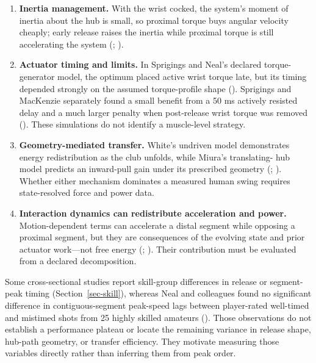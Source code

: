 \documentclass[
  letterpaper,
]{report}
\providecommand{\tightlist}{%
  \setlength{\itemsep}{0pt}\setlength{\parskip}{0pt}}
\begin{document}
\begin{enumerate}
\def\labelenumi{\arabic{enumi}.}
\tightlist
\item
  \textbf{Inertia management.} With the wrist cocked, the system's
  moment of inertia about the hub is small, so proximal torque buys
  angular velocity cheaply; early release raises the inertia while
  proximal torque is still accelerating the system
  (; ).
\item
  \textbf{Actuator timing and limits.} In Sprigings and Neal's declared
  torque-generator model, the optimum placed active wrist torque late,
  but its timing depended strongly on the assumed torque-profile shape
  (). Sprigings and
  MacKenzie separately found a small benefit from a 50 ms actively
  resisted delay and a much larger penalty when post-release wrist
  torque was removed (). These simulations do not identify a muscle-level
  strategy.
\item
  \textbf{Geometry-mediated transfer.} White's undriven model
  demonstrates energy redistribution as the club unfolds, while Miura's
  translating- hub model predicts an inward-pull gain under its
  prescribed geometry (;
  ). Whether either mechanism
  dominates a measured human swing requires state-resolved force and
  power data.
\item
  \textbf{Interaction dynamics can redistribute acceleration and power.}
  Motion-dependent terms can accelerate a distal segment while opposing
  a proximal segment, but they are consequences of the evolving state
  and prior actuator work---not free energy
  (;
  ). Their
  contribution must be evaluated from a declared decomposition.
\end{enumerate}

Some cross-sectional studies report skill-group differences in release
or segment-peak timing (Section~\ref{sec-skill}), whereas Neal and
colleagues found no significant difference in contiguous-segment
peak-speed lags between player-rated well-timed and mistimed shots from
25 highly skilled amateurs ().
Those observations do not establish a performance plateau or locate the
remaining variance in release shape, hub-path geometry, or transfer
efficiency. They motivate measuring those variables directly rather than
inferring them from peak order.
\end{document}
